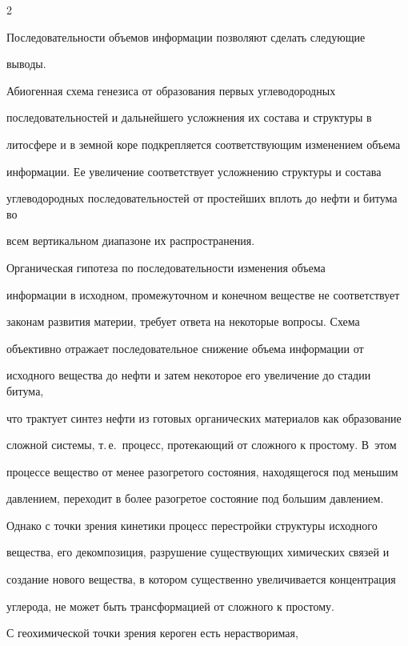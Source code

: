\begin{multicols}{2}
     

     Последовательности объемов информации позволяют сделать следующие 

выводы.

     

     Абиогенная схема генезиса от образования первых углеводородных 

последовательностей и дальнейшего усложнения их состава и структуры в\linebreak 

литосфере и в земной коре подкрепляется соответствующим изменением объема 

информации. Ее увеличение соответствует усложнению структуры и состава 

углеводородных последовательностей от простейших вплоть до нефти и битума во 

всем вертикальном диапазоне их распространения.

     

     Органическая гипотеза по последовательности изменения объема 

информации в исходном, промежуточном и конечном веществе не соответствует 

законам развития материи, требует ответа на некоторые вопросы. Схема 

объективно отражает последовательное снижение объема информации от 

исходного вещества до нефти и затем некоторое его увеличение до стадии битума, 

что трактует синтез нефти из готовых органических материалов как образование 

сложной системы, т.\,е.\ процесс, протекающий от сложного к простому. В~этом 

процессе вещество от менее разогретого состояния, находящегося под меньшим 

давлением, переходит в более разогретое состояние под большим давлением. 

     

     Однако с точки зрения кинетики процесс перестройки структуры исходного 

вещества, его декомпозиция, разрушение существующих химических связей и 

создание нового вещества, в котором существенно увеличивается концентрация 

углерода, не может быть трансформацией от сложного к прос\-тому. 

     

     С геохимической точки зрения кероген есть нерастворимая, 


\end{multicols}
